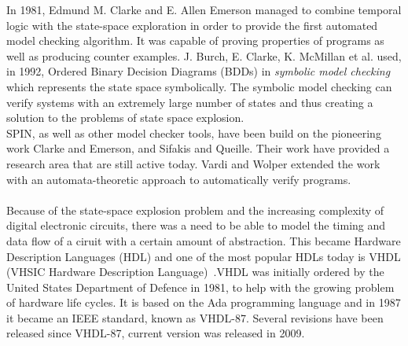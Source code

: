 In 1981, Edmund M. Clarke and E. Allen Emerson managed to combine temporal logic with the state-space exploration in order to provide the first automated model checking algorithm\cite{Clarke1981}. It was capable of proving properties of programs as well as producing counter examples.
J. Burch, E. Clarke, K. McMillan et al.\cite{Burch1992} used, in 1992, Ordered Binary Decision Diagrams (BDDs) in \textit{symbolic model checking} which represents the state space symbolically. The symbolic model checking can verify systems with an extremely large number of states and thus creating a solution to the problems of state space explosion.\\
SPIN, as well as other model checker tools, have been build on the pioneering work Clarke and Emerson\cite{Clarke1981}, and Sifakis and Queille\cite{Queille1982}. Their work have provided a research area that are still active today. Vardi and Wolper extended the work with an automata-theoretic approach to automatically verify programs\cite{Vardi1986}.\\\\

Because of the state-space explosion problem and the increasing complexity of digital electronic circuits, there was a need to be able to model the timing and data flow of a ciruit with a certain amount of abstraction. This became Hardware Description Languages (HDL) and one of the most popular HDLs today is VHDL (VHSIC Hardware Description Language)~\cite{VHDL}.VHDL was initially ordered by the United States Department of Defence in 1981, to help with the growing problem of hardware life cycles. It is based on the Ada programming language and in 1987 it became an IEEE standard, known as VHDL-87. Several revisions have been released since VHDL-87, current version was released in 2009.\\

